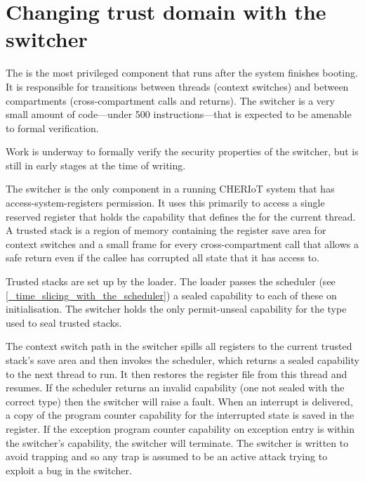 \section{Changing trust domain with the switcher}

The  is the most privileged component that runs after the system finishes booting.
It is responsible for transitions between threads (context switches) and between compartments (cross-compartment calls and returns).
The switcher is a very small amount of code—under 500 instructions—that is expected to be amenable to formal verification.

\begin{note}
Work is underway to formally verify the security properties of the switcher, but is still in early stages at the time of writing.
\end{note}

The switcher is the only component in a running CHERIoT system that has access-system-registers permission.
It uses this primarily to access a single reserved register that holds the capability that defines the  for the current thread.
A trusted stack is a region of memory containing the register save area for context switches and a small frame for every cross-compartment call that allows a safe return even if the callee has corrupted all state that it has access to.

Trusted stacks are set up by the loader.
The loader passes the scheduler (see \ref{_time_slicing_with_the_scheduler}) a sealed capability to each of these on initialisation.
The switcher holds the only permit-unseal capability for the type used to seal trusted stacks.

The context switch path in the switcher spills all registers to the current trusted stack's save area and then invokes the scheduler, which returns a sealed capability to the next thread to run.
It then restores the register file from this thread and resumes.
If the scheduler returns an invalid capability (one not sealed with the correct type) then the switcher will raise a fault.
When an interrupt is delivered, a copy of the program counter capability for the interrupted state is saved in the  register.
If the exception program counter capability on exception entry is within the switcher's capability, the switcher will terminate.
The switcher is written to avoid trapping and so any trap is assumed to be an active attack trying to exploit a bug in the switcher.


